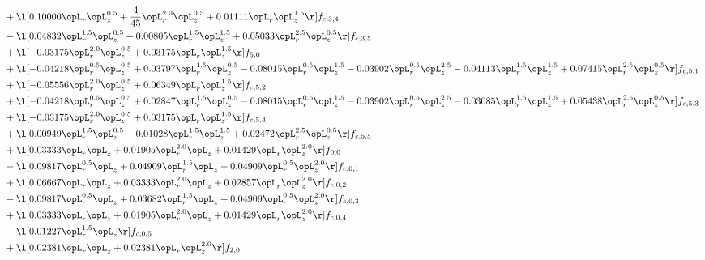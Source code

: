 \begin{alignat}{2}
& + \l[  0.10000 \opL_r \opL_z^{0.5} + \frac{4}{45} \opL_r^{2.0} \opL_z^{0.5} +  0.01111 \opL_r \opL_z^{1.5}  \r] f_{c,3,4} \nonumber \\ 
& - \l[  0.04832 \opL_r^{1.5} \opL_z^{0.5} +  0.00805 \opL_r^{1.5} \opL_z^{1.5} +  0.05033 \opL_r^{2.5} \opL_z^{0.5}  \r] f_{c,3,5} \nonumber \\ 
& + \l[  -0.03175 \opL_r^{2.0} \opL_z^{0.5} +  0.03175 \opL_r \opL_z^{1.5}  \r] f_{5,0} \nonumber \\ 
& + \l[  -0.04218 \opL_r^{0.5} \opL_z^{0.5} +  0.03797 \opL_r^{1.5} \opL_z^{0.5}   -0.08015 \opL_r^{0.5} \opL_z^{1.5}   -0.03902 \opL_r^{0.5} \opL_z^{2.5}   -0.04113 \opL_r^{1.5} \opL_z^{1.5} +  0.07415 \opL_r^{2.5} \opL_z^{0.5}  \r] f_{c,5,1} \nonumber \\ 
& + \l[  -0.05556 \opL_r^{2.0} \opL_z^{0.5} +  0.06349 \opL_r \opL_z^{1.5}  \r] f_{c,5,2} \nonumber \\ 
& + \l[  -0.04218 \opL_r^{0.5} \opL_z^{0.5} +  0.02847 \opL_r^{1.5} \opL_z^{0.5}   -0.08015 \opL_r^{0.5} \opL_z^{1.5}   -0.03902 \opL_r^{0.5} \opL_z^{2.5}   -0.03085 \opL_r^{1.5} \opL_z^{1.5} +  0.05438 \opL_r^{2.5} \opL_z^{0.5}  \r] f_{c,5,3} \nonumber \\ 
& + \l[  -0.03175 \opL_r^{2.0} \opL_z^{0.5} +  0.03175 \opL_r \opL_z^{1.5}  \r] f_{c,5,4} \nonumber \\ 
& + \l[  0.00949 \opL_r^{1.5} \opL_z^{0.5}   -0.01028 \opL_r^{1.5} \opL_z^{1.5} +  0.02472 \opL_r^{2.5} \opL_z^{0.5}  \r] f_{c,5,5} \nonumber \\ 
& + \l[  0.03333 \opL_r \opL_z +  0.01905 \opL_r^{2.0} \opL_z +  0.01429 \opL_r \opL_z^{2.0}  \r] f_{0,0} \nonumber \\ 
& - \l[  0.09817 \opL_r^{0.5} \opL_z +  0.04909 \opL_r^{1.5} \opL_z +  0.04909 \opL_r^{0.5} \opL_z^{2.0}  \r] f_{c,0,1} \nonumber \\ 
& + \l[  0.06667 \opL_r \opL_z +  0.03333 \opL_r^{2.0} \opL_z +  0.02857 \opL_r \opL_z^{2.0}  \r] f_{c,0,2} \nonumber \\ 
& - \l[  0.09817 \opL_r^{0.5} \opL_z +  0.03682 \opL_r^{1.5} \opL_z +  0.04909 \opL_r^{0.5} \opL_z^{2.0}  \r] f_{c,0,3} \nonumber \\ 
& + \l[  0.03333 \opL_r \opL_z +  0.01905 \opL_r^{2.0} \opL_z +  0.01429 \opL_r \opL_z^{2.0}  \r] f_{c,0,4} \nonumber \\ 
& - \l[  0.01227 \opL_r^{1.5} \opL_z  \r] f_{c,0,5} \nonumber \\ 
& + \l[  0.02381 \opL_r \opL_z +  0.02381 \opL_r \opL_z^{2.0}  \r] f_{2,0} \nonumber \\ 

\end{alignat}
